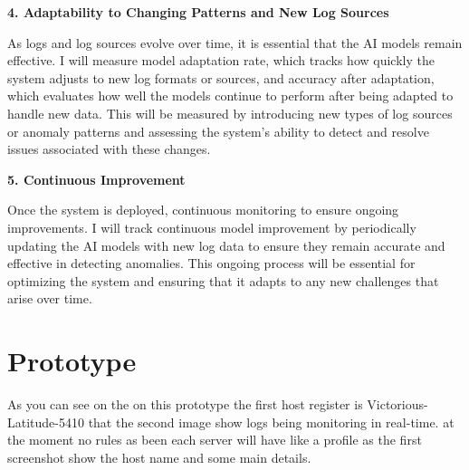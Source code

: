 \textbf{4. Adaptability to Changing Patterns and New Log Sources}


As logs and log sources evolve over time, it is essential that the AI models remain effective. I will measure model adaptation rate, which tracks how quickly the system adjusts to new log formats or sources, and accuracy after adaptation, which evaluates how well the models continue to perform after being adapted to handle new data. This will be measured by introducing new types of log sources or anomaly patterns and assessing the system’s ability to detect and resolve issues associated with these changes.


\textbf{5. Continuous Improvement}


Once the system is deployed, continuous monitoring to ensure ongoing improvements. I will track continuous model improvement by periodically updating the AI models with new log data to ensure they remain accurate and effective in detecting anomalies. This ongoing process will be essential for optimizing the system and ensuring that it adapts to any new challenges that arise over time.
















\section{Prototype}

As you can see on the on this prototype the first host register is Victorious-Latitude-5410 that the second image show logs being monitoring in real-time. at the moment no rules as been each server will have like a profile as the first screenshot show the host name and some main details.

